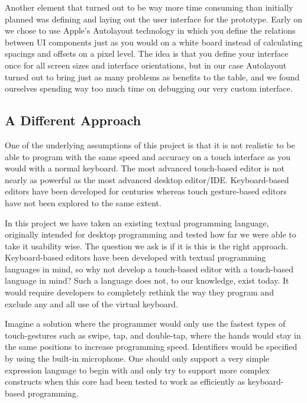 Another element that turned out to be way more time consuming than initially planned was defining and laying out the user interface for the prototype. Early on we chose to use Apple's Autolayout technology in which you define the relations between UI components just as you would on a white board instead of calculating spacings and offsets on a pixel level. The idea is that you define your interface once for all screen sizes and interface orientations, but in our case Autolayout turned out to bring just as many problems as benefits to the table, and we found ourselves spending way too much time on debugging our very custom interface.

\subsection{A Different Approach}
One of the underlying assumptions of this project is that it is not realistic to be able to program with the same speed and accuracy on a touch interface as you would with a normal keyboard. The most advanced touch-based editor is not nearly as powerful as the most advanced desktop editor/IDE. Keyboard-based editors have been developed for centuries whereas touch gesture-based editors have not been explored to the same extent. 

In this project we have taken an existing textual programming language, originally intended for desktop programming and tested how far we were able to take it usability wise. The question we ask is if it is this is the right approach. Keyboard-based editors have been developed with textual programming languages in mind, so why not develop a touch-based editor with a touch-based language in mind? Such a language does not, to our knowledge, exist today. It would require developers to completely rethink the way they program and exclude any and all use of the virtual keyboard.

Imagine a solution where the programmer would only use the fastest types of touch-gestures such as swipe, tap, and double-tap, where the hands would stay in the same positions to increase programming speed. Identifiers would be specified by using the built-in microphone. One should only support a very simple expression language to begin with and only try to support more complex constructs when this core had been tested to work as efficiently as keyboard-based programming.

